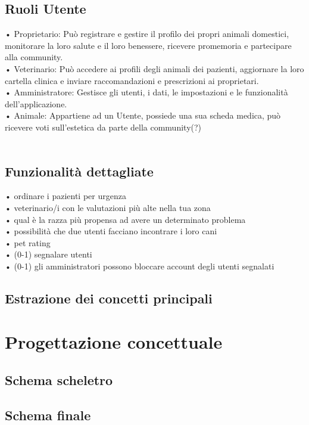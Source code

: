 \documentclass[a4paper,12pt]{report}
\begin{document}
\section{Ruoli Utente}
•	Proprietario: Può registrare e gestire il profilo dei propri animali domestici, monitorare la loro salute e il loro benessere, ricevere promemoria e partecipare alla community.\\
•	Veterinario: Può accedere ai profili degli animali dei pazienti, aggiornare la loro cartella clinica e inviare raccomandazioni e prescrizioni ai proprietari.\\
•	Amministratore: Gestisce gli utenti, i dati, le impostazioni e le funzionalità dell'applicazione.\\
•	Animale: Appartiene ad un Utente, possiede una sua scheda medica, può ricevere voti sull’estetica da parte della community(?)\\\\

\section{Funzionalità dettagliate}
•	ordinare i pazienti per urgenza\\
•	veterinario/i con le valutazioni più alte nella tua zona\\
•	qual è la razza più propensa ad avere un determinato problema\\
•	possibilità che due utenti facciano incontrare i loro cani\\
•	pet rating\\
•	(0-1) segnalare utenti\\
•	(0-1) gli amministratori possono bloccare account degli utenti segnalati \\

\section{Estrazione dei concetti principali}
\newpage
\chapter{Progettazione concettuale}
\section{Schema scheletro}
\section{Schema finale}
\newpage
\end{document}
